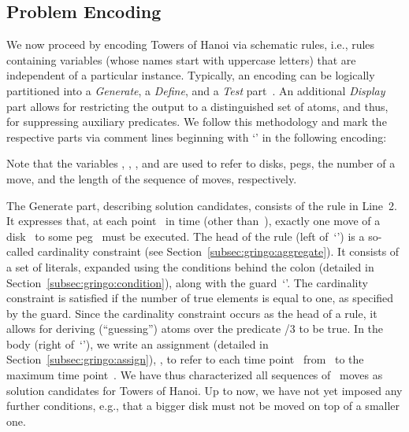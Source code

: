 \subsection{Problem Encoding}

We now proceed by encoding Towers of Hanoi via schematic rules,
i.e., rules containing variables (whose names start with uppercase letters)
that are independent of a particular instance.
Typically, an encoding can be logically partitioned
into a \emph{Generate}, a \emph{Define}, and a \emph{Test} part~\cite{lifschitz02a}.
An additional \emph{Display} part allows for restricting
the output to a distinguished set of atoms,
and thus, for suppressing auxiliary predicates.
%
We follow this methodology and
mark the respective parts via comment lines beginning with `\code{\%}' 
in the following encoding:%
%
%

%
Note that the variables , , , and  are used
to refer to disks, pegs, 
the number of a move, and the length of the sequence of moves, respectively.

The Generate part, describing solution candidates, consists of the rule in Line~2.
It expresses that,
at each point~ in time (other than~),
exactly one move of a disk~ to some peg~
must be executed.
The head of the rule (left of~`\code{:-}')
is a so-called cardinality constraint (see Section~\ref{subsec:gringo:aggregate}).
It consists of a set of literals,
expanded using the conditions behind the colon (detailed in Section~\ref{subsec:gringo:condition}),
along with the guard~`'.
The cardinality constraint is satisfied
if the number of true elements is equal to one, as specified by the guard.
Since the cardinality constraint occurs as the head of a rule,
it allows for deriving (``guessing'') atoms 
over the predicate /$3$ to be true.
In the body (right of~`\code{:-}'),
we write an assignment (detailed in Section~\ref{subsec:gringo:assign}),
,
to refer to each time point~
from~ to the maximum time point~. %
We have thus characterized all sequences of~ moves
as solution candidates for Towers of Hanoi.
Up to now, 
we have not yet imposed any further conditions, e.g.,
that a bigger disk must not be moved on top of a smaller one.


